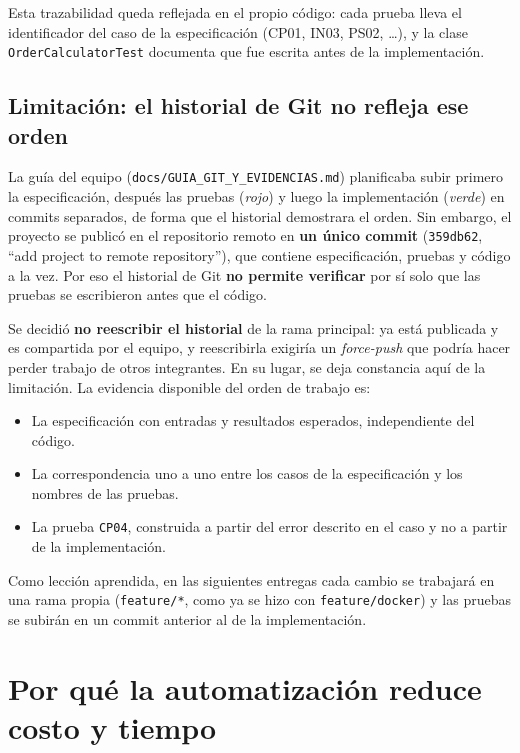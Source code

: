 \documentclass[11pt,a4paper]{article}
\begin{document}
Esta trazabilidad queda reflejada en el propio código: cada prueba lleva el identificador del caso de
la especificación (CP01, IN03, PS02, \ldots), y la clase \texttt{OrderCalculatorTest} documenta que fue
escrita antes de la implementación.

\subsection{Limitación: el historial de Git no refleja ese orden}

La guía del equipo (\texttt{docs/GUIA\_GIT\_Y\_EVIDENCIAS.md}) planificaba subir primero la
especificación, después las pruebas (\emph{rojo}) y luego la implementación (\emph{verde}) en commits
separados, de forma que el historial demostrara el orden. Sin embargo, el proyecto se publicó en el
repositorio remoto en \textbf{un único commit} (\texttt{359db62}, ``add project to remote
repository''), que contiene especificación, pruebas y código a la vez. Por eso el historial de Git
\textbf{no permite verificar} por sí solo que las pruebas se escribieron antes que el código.

Se decidió \textbf{no reescribir el historial} de la rama principal: ya está publicada y es compartida
por el equipo, y reescribirla exigiría un \emph{force-push} que podría hacer perder trabajo de otros
integrantes. En su lugar, se deja constancia aquí de la limitación. La evidencia disponible del orden
de trabajo es:

\begin{itemize}[noitemsep]
  \item La especificación con entradas y resultados esperados, independiente del código.
  \item La correspondencia uno a uno entre los casos de la especificación y los nombres de las pruebas.
  \item La prueba \texttt{CP04}, construida a partir del error descrito en el caso y no a partir de la
        implementación.
\end{itemize}

Como lección aprendida, en las siguientes entregas cada cambio se trabajará en una rama propia
(\texttt{feature/*}, como ya se hizo con \texttt{feature/docker}) y las pruebas se subirán en un
commit anterior al de la implementación.

\section{Por qué la automatización reduce costo y tiempo}
\label{sec:costos}
\end{document}
